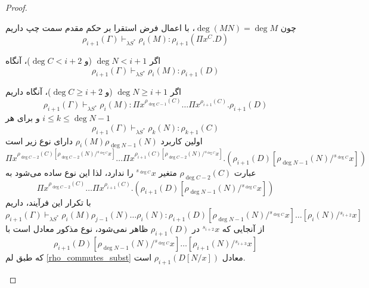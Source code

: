 \begin{proof}
\begin{itemize}
چون
$\operatorname{deg}(MN) = \operatorname{deg} M$،
با اعمال فرض استقرا بر حکم مقدم سمت چپ داریم
\begin{equation*}
\rho_{i+1}(\Gamma) \vdash_{\lambda S^*} \rho_{i}(M) : \rho_{i+1}(\Pi x^C.D)
\end{equation*}

اگر
$\operatorname{deg} N < i + 1$ (و $\operatorname{deg} C < i + 2$)،
آنگاه
\begin{equation*}
\rho_{i+1}(\Gamma) \vdash_{\lambda S^*} \rho_{i}(M) : \rho_{i+1}(D)
\end{equation*}

اگر
$\operatorname{deg} N \ge i + 1$ (و $\operatorname{deg} C \ge i + 2$)،
آنگاه داریم
\begin{equation*}
\rho_{i+1}(\Gamma) \vdash_{\lambda S^*} \rho_{i}(M) : \Pi x^{\rho_{\operatorname{deg} C - 1}(C)} \dots \Pi x^{\rho_{i+1}(C)}.\rho_{i+1}(D)
\end{equation*}
و برای هر
$i \le k \le \operatorname{deg} N - 1$
\begin{equation*}
\rho_{i+1}(\Gamma) \vdash_{\lambda S^*} \rho_{k}(N) : \rho_{k+1}(C)
\end{equation*}
اولین کاربرد
$\rho_i(M)\rho_{\operatorname{deg} N - 1}(N)$
دارای نوع زیر است
\begin{equation*}
\Pi x^{\rho_{\operatorname{deg} C - 2}(C)[\rho_{\operatorname{deg} C - 2}(N)/{}^{s_{\operatorname{deg}C}}x]} \dots \Pi x^{\rho_{i+1}(C)[\rho_{\operatorname{deg} C - 2}(N)/{}^{s_{\operatorname{deg}C}}x]}.(\rho_{i+1}(D)[\rho_{\operatorname{deg} N - 1}(N)/{}^{s_{\operatorname{deg}C}}x])
\end{equation*}
عبارت
$\rho_{\operatorname{deg} C - 2}(C)$
متغیر
${}^{s_{\operatorname{deg}C}}x$
را ندارد، لذا این نوع ساده می‌شود به
\begin{equation*}
\Pi x^{\rho_{\operatorname{deg} C - 2}(C)} \dots \Pi x^{\rho_{i+1}(C)}.(\rho_{i+1}(D)[\rho_{\operatorname{deg} N - 1}(N)/{}^{s_{\operatorname{deg}C}}x])
\end{equation*}
با تکرار این فرآیند، داریم
\begin{equation*}
\rho_{i+1}(\Gamma) \vdash_{\lambda S^*} \rho_{i}(M) \rho_{j-1}(N) \dots \rho_{i}(N) : \rho_{i+1}(D) [\rho_{\operatorname{deg} N - 1}(N)/{}^{s_{\operatorname{deg}C}}x] \dots [\rho_{i}(N)/{}^{s_{i+2}}x]
\end{equation*}
از آنجایی که
${}^{s_{i+2}}x$
در
$\rho_{i+1}(D)$
ظاهر نمی‌شود، نوع مذکور معادل است با
\begin{equation*}
\rho_{i+1}(D) [\rho_{\operatorname{deg} N - 1}(N)/{}^{s_{\operatorname{deg}C}}x] \dots [\rho_{i+1}(N)/{}^{s_{i+3}}x]
\end{equation*}
که طبق لم
\ref{rho_commutes_subst}
معادل
$\rho_{i+1}(D[N/x])$
است.


\end{itemize}
\end{proof}
